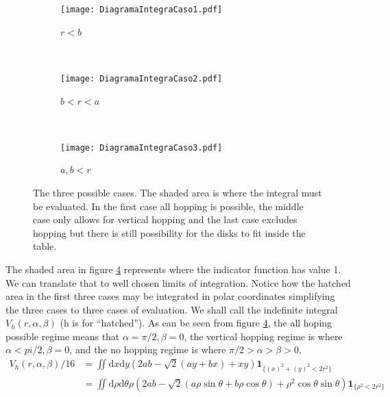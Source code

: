 \documentclass[letterpaper,10pt, jcp, aps]{revtex4-1}
\newcommand{\rd}{\!\mathrm{d}}
\newcommand{\indicator}[1]{\mathbf{1}_{ \{   #1 \} } }
\begin{document}
\begin{figure}[h]
        \centering
        \begin{subfigure}[b]{0.32\textwidth}
          \centering
          \texttt{[image: DiagramaIntegraCaso1.pdf]}
          \caption{$r<b$}
          \label{Caso1}
        \end{subfigure}%
        ~ %
        \begin{subfigure}[b]{0.32\textwidth}
          \centering
          \texttt{[image: DiagramaIntegraCaso2.pdf]}
          \caption{$b<r<a$}
          \label{Caso2}
        \end{subfigure}%
        ~ %
        \begin{subfigure}[b]{0.32\textwidth}
          \centering
          \texttt{[image: DiagramaIntegraCaso3.pdf]}
          \caption{$a,b<r$}
          \label{Caso3}
        \end{subfigure}%
        \caption{The three possible cases. The shaded area is where the integral
          must be evaluated. In the first case all hopping is possible, the middle case
          only allows for vertical hopping and the last case excludes hopping but there
        is still possibility for the disks to fit inside the table.}
\label{CasosIntegra}
\end{figure}
The shaded area in figure \ref{CasosIntegra} represents where the indicator function
has value 1. We can translate that to well chosen limits of integration. Notice
how the hatched area in the first three cases may be integrated in polar coordinates
simplifying the three cases to three cases of evaluation. We shall call the
indefinite integral $V_h(r,\alpha,\beta)$ (h is for ``hatched'').
As can be seen from figure \ref{CasosIntegra}, the all hoping possible regime
means that $\alpha=\pi/2, \beta=0$, the vertical hopping regime is where
$\alpha<pi/2, \beta=0$, and the no hopping regime is where $\pi/2>\alpha>\beta>0$.
\begin{equation}\label{Vhatch1}
\begin{split}
V_h(r,\alpha,\beta)/16 &=\iint \rd x \rd y (2ab-\sqrt{2}(ay+bx)+x y)
\indicator{(x)^2+(y)^2<2r^2 }\\
&=\iint \rd \rho \rd \theta \rho (2ab
-\sqrt{2}(a\rho\sin\theta+b\rho\cos\theta)
+\rho^2 \cos\theta\sin\theta)
\indicator{\rho^2<2r^2 }
\end{split}
\end{equation}
\end{document}
